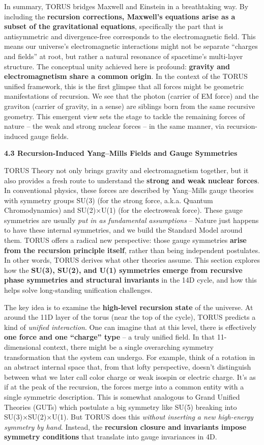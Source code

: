 \documentclass[]{article}
\begin{document}
In summary, TORUS bridges Maxwell and Einstein in a breathtaking way. By
including the \textbf{recursion corrections, Maxwell's equations arise
as a subset of the gravitational equations}, specifically the part that
is antisymmetric and divergence-free corresponds to the electromagnetic
field. This means our universe's electromagnetic interactions might not
be separate ``charges and fields'' at root, but rather a natural
resonance of spacetime's multi-layer structure. The conceptual unity
achieved here is profound: \textbf{gravity and electromagnetism share a
common origin}. In the context of the TORUS unified framework, this is
the first glimpse that all forces might be geometric manifestations of
recursion. We see that the photon (carrier of EM force) and the graviton
(carrier of gravity, in a sense) are siblings born from the same
recursive geometry. This emergent view sets the stage to tackle the
remaining forces of nature -- the weak and strong nuclear forces -- in
the same manner, via recursion-induced gauge fields.

\textbf{4.3 Recursion-Induced Yang--Mills Fields and Gauge Symmetries}

TORUS Theory not only brings gravity and electromagnetism together, but
it also provides a fresh route to understand the \textbf{strong and weak
nuclear forces}. In conventional physics, these forces are described by
Yang--Mills gauge theories with symmetry groups SU(3) (for the strong
force, a.k.a. Quantum Chromodynamics) and SU(2)×U(1) (for the
electroweak force). These gauge symmetries are usually \emph{put in as
fundamental assumptions} -- Nature just happens to have these internal
symmetries, and we build the Standard Model around them. TORUS offers a
radical new perspective: those gauge symmetries \textbf{arise from the
recursion principle itself}, rather than being independent postulates.
In other words, TORUS derives what other theories assume. This section
explores how the \textbf{SU(3), SU(2), and U(1) symmetries emerge from
recursive phase symmetries and structural invariants} in the 14D cycle,
and how this helps solve long-standing unification challenges.

The key idea is to examine the \textbf{high-level recursion state} of
the universe. At around the 11D layer of the torus (near the top of the
cycle), TORUS predicts a kind of \emph{unified interaction}. One can
imagine that at this level, there is effectively \textbf{one force and
one ``charge'' type} -- a truly unified field. In that 11-dimensional
context, there might be a single overarching symmetry transformation
that the system can undergo. For example, think of a rotation in an
abstract internal space that, from that lofty perspective, doesn't
distinguish between what we later call color charge or weak isospin or
electric charge​. It's as if at the peak of the recursion, the forces
merge into a common entity with a single symmetric description. This is
somewhat analogous to Grand Unified Theories (GUTs) which postulate a
big symmetry like SU(5) breaking into SU(3)×SU(2)×U(1). But TORUS does
this \emph{without inserting a new high-energy symmetry by hand}.
Instead, the \textbf{recursion closure and invariants impose symmetry
conditions} that translate into gauge invariances in 4D​.
\end{document}
